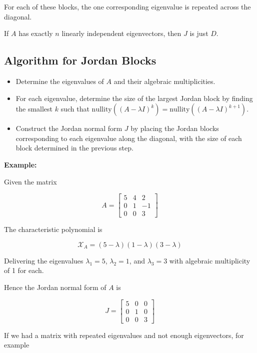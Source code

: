 For each of these blocks, the one corresponding eigenvalue is repeated across the diagonal.

If \(A\) has exactly \(n\) linearly independent eigenvectors, then \(J\) is just \(D\).

\subsection{Algorithm for Jordan Blocks}

\begin{itemize}

    \item Determine the eigenvalues of \(A\) and their algebraic multiplicities. 

    \item For each eigenvalue, determine the size of the largest Jordan block by finding the smallest \(k\) such that 
          \(\mathrm{nullity}((A - \lambda I)^k) = \mathrm{nullity}((A - \lambda I)^{k+1})\).

    \item Construct the Jordan normal form \(J\) by placing the Jordan blocks corresponding to each eigenvalue along the diagonal, 
          with the size of each block determined in the previous step.
\end{itemize}

\textbf{Example:}

Given the matrix

\[
    A = \begin{bmatrix}
        5 & 4 & 2 \\
        0 & 1 & -1 \\
        0 & 0 & 3
    \end{bmatrix}
\]

The characteristic polynomial is

\[
    \mathcal{X}_A = (5 - \lambda)(1 - \lambda)(3 - \lambda)
\]

Delivering the eigenvalues \(\lambda_1 = 5\), \(\lambda_2 = 1\), and \(\lambda_3 = 3\) with algebraic multiplicity of 1 for each.

Hence the Jordan normal form of \(A\) is

\[
    J = \begin{bmatrix}
        5 & 0 & 0 \\
        0 & 1 & 0 \\
        0 & 0 & 3
    \end{bmatrix}
\]

If we had a matrix with repeated eigenvalues and not enough eigenvectors, for example

